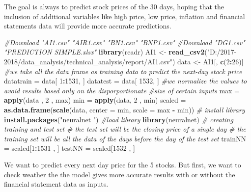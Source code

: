 \documentclass[
  11pt,
]{article}
\newenvironment{Shaded}{\begin{snugshade}}{\end{snugshade}}
\newcommand{\CommentTok}[1]{\textcolor[rgb]{0.56,0.35,0.01}{\textit{#1}}}
\newcommand{\DataTypeTok}[1]{\textcolor[rgb]{0.13,0.29,0.53}{#1}}
\newcommand{\DecValTok}[1]{\textcolor[rgb]{0.00,0.00,0.81}{#1}}
\newcommand{\KeywordTok}[1]{\textcolor[rgb]{0.13,0.29,0.53}{\textbf{#1}}}
\newcommand{\NormalTok}[1]{#1}
\newcommand{\OperatorTok}[1]{\textcolor[rgb]{0.81,0.36,0.00}{\textbf{#1}}}
\newcommand{\StringTok}[1]{\textcolor[rgb]{0.31,0.60,0.02}{#1}}
\begin{document}
The goal is always to predict stock prices of the 30 days, hoping that
the inclusion of additional variables like high price, low price,
inflation and financial statements data will provide more accurate
predictions.

\begin{Shaded}
\begin{Highlighting}[]
\CommentTok{#Download "AI1.csv" "AIR1.csv" "BN1.csv" "BNP1.csv" }
\CommentTok{#Download "DG1.csv" "PREDICTION SIMPLE.xlsx"}
\KeywordTok{library}\NormalTok{(readr)}
\NormalTok{AI1 <-}\StringTok{ }\KeywordTok{read_csv2}\NormalTok{(}\StringTok{"D:/2017-2018/data_analysis/technical_analysis/report/AI1.csv"}\NormalTok{)}
\NormalTok{data <-}\StringTok{ }\NormalTok{AI1[, }\KeywordTok{c}\NormalTok{(}\DecValTok{2}\OperatorTok{:}\DecValTok{26}\NormalTok{)]}
\CommentTok{#we take all the data frame as training data to predict the next-day stock price}
\NormalTok{datatrain =}\StringTok{ }\NormalTok{data[ }\DecValTok{1}\OperatorTok{:}\DecValTok{1531}\NormalTok{, ]}
\NormalTok{datatest =}\StringTok{ }\NormalTok{data[ }\DecValTok{1532}\NormalTok{, ]}
\CommentTok{#we normalize the values to avoid results based only on the disporportionate}
\CommentTok{#size of certain inputs}
\NormalTok{max =}\StringTok{ }\KeywordTok{apply}\NormalTok{(data , }\DecValTok{2}\NormalTok{ , max)}
\NormalTok{min =}\StringTok{ }\KeywordTok{apply}\NormalTok{(data, }\DecValTok{2}\NormalTok{ , min)}
\NormalTok{scaled =}\StringTok{ }\KeywordTok{as.data.frame}\NormalTok{(}\KeywordTok{scale}\NormalTok{(data, }\DataTypeTok{center =}\NormalTok{ min, }\DataTypeTok{scale =}\NormalTok{ max }\OperatorTok{-}\StringTok{ }\NormalTok{min))}
\CommentTok{# install library}
\KeywordTok{install.packages}\NormalTok{(}\StringTok{"neuralnet "}\NormalTok{)}
\CommentTok{#load library}
\KeywordTok{library}\NormalTok{(neuralnet)}
\CommentTok{# creating training and test set}
\CommentTok{# the test set will be the closing price of a single day}
\CommentTok{# the training set will be all the data of the days before the day of the test set}
\NormalTok{trainNN =}\StringTok{ }\NormalTok{scaled[}\DecValTok{1}\OperatorTok{:}\DecValTok{1531}\NormalTok{ , ]}
\NormalTok{testNN =}\StringTok{ }\NormalTok{scaled[}\DecValTok{1532}\NormalTok{ , ] }
\end{Highlighting}
\end{Shaded}

We want to predict every next day price for the 5 stocks. But first, we
want to check weather the the model gives more accurate results with or
without the financial statement data as inputs.
\end{document}
